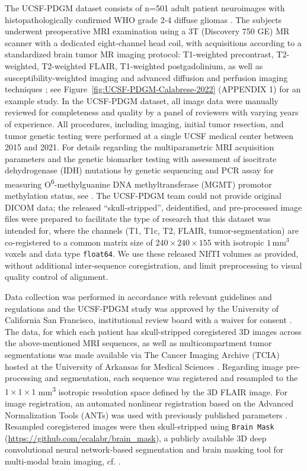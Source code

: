 \documentclass[a4paper,11pt,leqno]{article}
\begin{document}
The UCSF-PDGM dataset consists of n=501 adult patient neuroimages with
histopathologically confirmed WHO grade 2-4 diffuse gliomas \cite{Louis2021}. %
The subjects underwent preoperative MRI examination using a
3T (Discovery 750 GE) MR scanner with a dedicated eight-channel head
coil, with acquisitions according to a standardized brain tumor MR
imaging protocol: T1-weighted precontrast, T2-weighted,
T2-weighted FLAIR, T1-weighted postgadolinium, as well as
susceptibility-weighted imaging and advanced diffusion and perfusion
imaging techniques \cite{Calabrese2022b}; %
see Figure~\ref{fig:UCSF-PDGM-Calabrese-2022} (APPENDIX 1) for an example study.
In the UCSF-PDGM dataset, all image data
were manually reviewed for completeness and quality by a panel of
reviewers with varying years of experience. All procedures, including
imaging, initial tumor resection, and tumor genetic testing were
performed at a single UCSF medical center between 2015 and 2021. For
details regarding the multiparametric MRI acquisition parameters and the
genetic biomarker testing with assessment of isocitrate dehydrogenase
(IDH) mutations by genetic sequencing and PCR assay for measuring
O\textsuperscript{6}-methylguanine DNA methyltransferase (MGMT) promotor
methylation status, see
\cite{Calabrese2022a,Calabrese2022b,Calabrese2022c,Calabrese2020}.
The UCSF-PDGM team could not provide original DICOM data; the
released ``skull-stripped'', deidentified, and pre-processed image
files were prepared to facilitate the type of research that this
dataset was intended for, where the channels (T1, T1c, T2, FLAIR,
tumor-segmentation) are co-registered to a common matrix size of
$240\times240\times155$ with isotropic $1$\,mm$^{3}$ voxels and data
type \texttt{float64}. We use these released NIfTI volumes
as provided, without additional inter-sequence coregistration, and
limit preprocessing to visual quality control of alignment.




Data collection was performed in accordance with relevant guidelines and
regulations and the UCSF-PDGM study was approved by the University of
California San Francisco, institutional review board with a waiver for
consent \cite{Calabrese2022b,Calabrese2022c}. %
The data, for which each patient has skull-stripped coregistered 3D images across
the above-mentioned MRI sequences, as well as multicompartment tumor
segmentations was made available via The Cancer Imaging Archive (TCIA)
hosted at the University of Arkansas for Medical Sciences
\cite{Calabrese2022c,Clark2013}.
Regarding image pre-processing and segmentation, each sequence was registered and
resampled to the $1 \times 1 \times 1$ mm\textsuperscript{3} isotropic resolution
space defined by the 3D FLAIR image. For image registration, an
automated nonlinear registration based on the Advanced Normalization
Tools (ANTs) \cite{Avants2011} %
was used with previously published parameters \cite{Calabrese2021}.
Resampled coregistered images were then skull-stripped using
\texttt{Brain Mask} ({\small \url{https://github.com/ecalabr/brain_mask}}), a publicly
available 3D deep convolutional neural network-based segmentation and
brain masking tool for multi-modal brain imaging, cf. \cite{Calabrese2021}.\\
\end{document}
